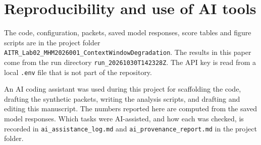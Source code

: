 \documentclass[11pt,a4paper]{article}
\begin{document}
\section*{Reproducibility and use of AI tools}

{\sloppy
The code, configuration, packets, saved model responses, score tables and figure scripts are in the project folder
\texttt{AITR\_Lab02\_MHM2026001\_ContextWindowDegradation}.
The results in this paper come from the run directory \texttt{run\_20261030T142328Z}.
The API key is read from a local \texttt{.env} file that is not part of the repository.
\par}

An AI coding assistant was used during this project for scaffolding the code, drafting the synthetic packets,
writing the analysis scripts, and drafting and editing this manuscript.
The numbers reported here are computed from the saved model responses.
Which tasks were AI-assisted, and how each was checked, is recorded in \texttt{ai\_assistance\_log.md} and \texttt{ai\_provenance\_report.md} in the project folder.



\end{document}
